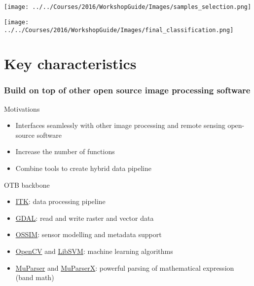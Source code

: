 \documentclass[8pt]{beamer}
\begin{document}
\vspace*{-6.5mm}
\begin{frame}[plain]
\hspace*{-11mm}
    \texttt{[image: ../../Courses/2016/WorkshopGuide/Images/samples\_selection.png]}
\end{frame}


\vspace*{-6.5mm}
\begin{frame}[plain]
\hspace*{-11mm}
    \texttt{[image: ../../Courses/2016/WorkshopGuide/Images/final\_classification.png]}
\end{frame}


\section{Key characteristics}

\begin{frame}
\frametitle{Build on top of other open source image processing software}
\begin{block}{Motivations}
\begin{itemize}
\item Interfaces seamlessly with other image processing and remote sensing open-source software
\item Increase the number of functions
\item Combine tools to create hybrid data pipeline
\end{itemize}
\end{block}

\begin{block}{OTB backbone}
\begin{itemize}
\item \href{www.itk.org}{ITK}: data processing pipeline
\item \href{www.gdal.org}{GDAL}: read and write raster and vector data
\item \href{www.ossim.org}{OSSIM}: sensor modelling and metadata support
\item \href{www.opencv.org}{OpenCV} and \href{www.libsvm.org}{LibSVM}: machine learning algorithms
\item \href{www.muparser.org}{MuParser} and \href{www.muparserx.org}{MuParserX}:
  powerful parsing of mathematical expression (band math)
\end{itemize}
\end{block}

\end{frame}
\end{document}

